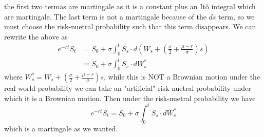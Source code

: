 \documentclass[oneside]{book}
\begin{document}
the first two termas are martingale as it is a constant plus an Itô integral which are martingale. The last term
is not a martingale because of the $ds$ term, so we must choose the risk-nuetral probability such that
this term disappears. We can rewrite the above as
\begin{align*}
    e^{-rt}S_t &= S_0 + \sigma \int_0^t S_s \cdot d\left(W_s + \left(\frac{\sigma}{2} + \frac{\mu - r}{\sigma}\right)s\right) \\
               &= S_0 + \sigma \int_0^t S_s \cdot dW_s^*
\end{align*}
where $W_s^* = W_s + \left(\frac{\sigma}{2} + \frac{\mu - r}{\sigma}\right)s$, while this is NOT a Brownian motion
under the real world probability we can take an "artificial" risk nuetral probability under which it is a
Brownian motion. Then under the risk-nuetral probability we have
$$
    e^{-rt}S_t= S_0 + \sigma \int_0^t S_s \cdot dW_s^*
$$
which is a martingale as we wanted.
\end{document}
